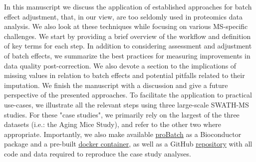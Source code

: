 \documentclass[num-refs]{wiley-article}
\begin{document}
In this manuscript we discuss the application of established approaches for batch effect adjustment, that, in our view, are too seldomly used in proteomics data analysis. We also look at these techniques while focusing on various MS-specific challenges. We start by providing a brief overview of the workflow and definition of key terms for each step. In addition to considering assessment and adjustment of batch effects, we summarize the best practices for measuring improvements in data quality post-correction. We also devote a section to the implications of missing values in relation to batch effects and potential pitfalls related to their imputation. We finish the manuscript with a discussion and give a future perspective of the presented approaches. To facilitate the application to practical use-cases, we illustrate all the relevant steps using three large-scale SWATH-MS studies. For these "case studies", we primarily rely on the largest of the three datasets (i.e.: the Aging Mice Study), and refer to the other two where appropriate. Importantly, we also make available \underline{\href{https://bioconductor.org/packages/release/bioc/html/proBatch.html}{proBatch}} as a Bioconductor package and a pre-built \underline{\href{https://hub.docker.com/repository/docker/digitalproteomes/probatch}{docker container}}, as well as a GitHub  \underline{\href{https://github.com/symbioticMe/batch_effects_workflow_code}{repository}} with all code and data required to reproduce the case study analyses.
\end{document}
